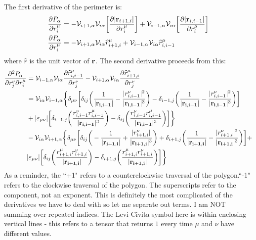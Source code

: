 \documentclass[12pt,a4paper]{article}
\begin{document}
The first derivative of the perimeter is:
\begin{align}
	 \pdv{P_\alpha}{r_i^\mu} &= -\mathcal{V}_{i+1,\alpha}\mathcal{V}_{i\alpha} \bigg[ \pdv{|\vb{r}_{i+1,i}|}{r_i^\mu}\bigg] + \mathcal{V}_{i-1,\alpha}\mathcal{V}_{i\alpha} \bigg[ \pdv{|\vb{r}_{i,i-1}|}{r_i^\mu}\bigg]\\
 \pdv{P_\alpha}{r_i^\mu} &= -\mathcal{V}_{i+1,\alpha}\mathcal{V}_{i\alpha} \widehat{r}_{i+1,i}^\mu + \mathcal{V}_{i-1,\alpha}\mathcal{V}_{i\alpha} \widehat{r}_{i,i-1}^\mu\\
\end{align}
where $\widehat{r}$ is the unit vector of $\vb{r}$. 
The second derivative proceeds from this:
\begin{align}
	\pdv[2]{P_\alpha}{r_j^\nu}{r_i^\mu} &= \mathcal{V}_{i-1,\alpha}\mathcal{V}_{i\alpha} \pdv{\widehat{r}_{i,i-1}^\mu}{r_j^\nu} -\mathcal{V}_{i+1,\alpha}\mathcal{V}_{i\alpha} \pdv{\widehat{r}_{i+1,i}^\mu}{r_j^\nu} \\	
	&= \mathcal{V}_{i \alpha} \mathcal{V}_{i-1,\alpha} \bigg\{ \delta_{\mu \nu} \bigg[\delta_{ij} \bigg( \frac{1}{|\vb{r_{i,i-1}}|} - \frac{|r_{i,i-1}^\nu|^2}{|\vb{r_{i,i-1}}|^3}\bigg) - \delta_{i-1,j}\bigg(\frac{1}{|\vb{r_{i,i-1}}|} - \frac{|r_{i,i-1}^\nu|^2}{|\vb{r_{i,i-1}}|^3}\bigg)\bigg]\\
	& + |\varepsilon_{\mu \nu}| \bigg[\delta_{i-1,j}\bigg(\frac{r_{i,i-1}^\nu r_{i,i-1}^\mu}{|\vb{r_{i,i-1}}|^3}\bigg) - \delta_{ij}\bigg(\frac{r_{i,i-1}^\nu r_{i,i-1}^\mu}{|\vb{r_{i,i-1}}|^3}\bigg)\bigg]\bigg\} \\
	&  - \mathcal{V}_{i \alpha} \mathcal{V}_{i+1,\alpha}\bigg\{\delta_{\mu\nu}\bigg[\delta_{ij}\bigg(-\frac{1}{|\vb{r_{i+1,i}}|} + \frac{|r_{i+1,i}^\nu|}{|\vb{r_{i+1,i}}|^3}\bigg) + \delta_{i+1,j} \bigg(\frac{1}{|\vb{r_{i+1,i}}|} - \frac{|r_{i+1,i}^\nu|^2}{|\vb{r_{i+1,i}}|^3}\bigg)\bigg] + \\
	&|\varepsilon_{\mu\nu}|\bigg[\delta_{ij}\bigg( \frac{r_{i+1,i}^\mu r_{i+1,i}^\nu}{|\vb{r_{i+1,i}}|}\bigg) - \delta_{i+1,j}\bigg( \frac{r_{i+1,i}^\mu r_{i+1,i}^\nu}{|\vb{r_{i+1,i}}|}\bigg) \bigg]\bigg\}
\end{align}
As a reminder, the ``+1" refers to a counterclockwise traversal of the polygon.``-1" refers to the clockwise traversal of the polygon. The superscripts refer to the component, not an exponent. 
This is definitely the most complicated of the derivatives we have to deal with so let me separate out terms. I am NOT summing over repeated indices. The Levi-Civita symbol here is within enclosing vertical lines - this refers to a tensor that returns $1$ every time $\mu$ and $\nu$ have different values. 
\end{document}
